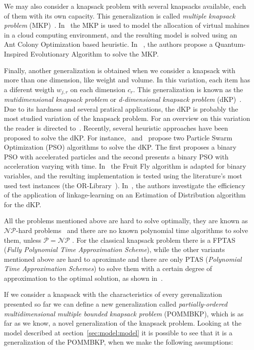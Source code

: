 We may also consider a knapsack problem with several knapsacks available, each of them with its own capacity. This generalization is called 
\textit{multiple knapsack problem} (MKP)~\cite{kellerer2004knapsack}. In~\cite{amarante2013} the MKP is used to model the allocation of virtual mahines in a 
cloud computing environment, and the resulting model is solved using an Ant Colony Optimization based heuristic. 
In ~\cite{patvardhan2014}, the authors propose a Quantum-Inspired Evolutionary Algorithm to solve the MKP.

Finally, another generalization is obtained when we consider a knapsack with more than one dimension, like weight and volume. In this variation, 
each item has a diferent weigth $w_{j,r}$ on each dimension $c_r$. This generalization is known as the \textit{mutidimensional knapsack problem} 
or \textit{d-dimensional knapsack problem} (dKP)~\cite{kellerer2004knapsack}. Due to its hardness and several pratical applications, the dKP is probably 
the most studied variation of the knapsack problem. For an overview on this variation the reader is directed to~\cite{freville2004}. 
Recently, several heuristic approaches have been proposed to solve the dKP. For instance,~\cite{beheshti2013} and~\cite{chih2014} propose two Particle
Swarm Optimization (PSO) algorithms to solve the dKP. The first proposes a binary PSO with accelerated particles and the second presents a binary PSO 
with acceleration varying with time. In~\cite{wang2013} the Fruit Fly algorithm is adapted for binary variables, and the resulting implementation is 
tested using the literature's most used test instances (the OR-Library~\cite{chubeasley1998}). In~\cite{martins2014}, the authors investigate the efficiency
of the application of linkage-learning on an Estimation of Distribution algorithm for the dKP.

All the problems mentioned above are hard to solve optimally, they are known as $\mathcal{NP}$-hard problems~\cite{kellerer2004knapsack} and there 
are no known polynomial time algorithms to solve them, unless $\mathcal{P} = \mathcal{NP}$ \cite{garey1978}.
For the classical knapsack problem there is a FPTAS (\textit{Fully Polynomial Time Approximation Scheme}),
while the other variants mentioned above are hard to aproximate and there are only PTAS (\textit{Polynomial Time Approximation Schemes}) 
to solve them with a certain degree of approximation to the optimal solution, as shown in~\cite{pok2002, puchinger2006core, dawande2000approximation}. 

If we consider a knapsack with the characteristics of every gerenalization presented so far we can define a new generalization
called \textit{partially-ordered multidimensional multiple bounded knapsack problem} (POMMBKP), which is as far as we know, a novel generalization of the
knapsack problem. Looking at the model described at section~\ref{sec:model:model} it is possible to see that it is a generalization of the POMMBKP, 
when we make the following assumptions:

